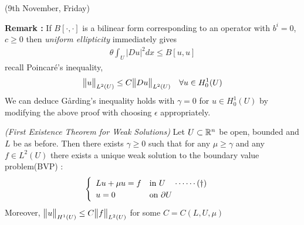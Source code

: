 \documentclass[12pt,a4paper]{report}
\begin{document}
\newday

(9th November, Friday)
\s

\textbf{Remark :} If $B[\cdot,\cdot]$ is a bilinear form corresponding to an operator with $b^i=0$, $c\geq 0$ then \emph{uniform ellipticity} immediately gives
\begin{align*}
\theta \int_U |Du|^2 dx \leq B[u,u]
\end{align*}
recall Poincar\'{e}'s inequality,
\begin{align*}
\bigl\lVert u\bigr\rVert_{L^2(U)} \leq C \bigl\lVert Du\bigr\rVert_{L^2(U)} \quad \forall u\in H_0^1 (U)
\end{align*}
We can deduce G{\aa}rding's inequality holds with $\gamma =0$ for $u\in H_0^1 (U)$ by modifying the above proof with choosing $\epsilon$ appropriately.
\s

\thm \emph{(First Existence Theorem for Weak Solutions)} Let $U\subset \mathbb{R}^n$ be open, bounded and $L$ be as before. Then there exists $\gamma \geq 0$ such that for any $\mu \geq \gamma$ and any $f\in L^2(U)$ there exists a unique weak solution to the boundary value problem(BVP) :
\begin{align*}
\begin{cases}
\begin{array}{ll}
Lu + \mu u =f & \text{in } U  \quad \cdots\cdots (\dagger) \\
u = 0 & \text{on } \partial U
\end{array}
\end{cases}
\end{align*}
Moreover, $\bigl\lVert u\bigr\rVert_{H^1(U)} \leq C \bigl\lVert f\bigr\rVert_{L^2(U)}$ for some $C = C(L,U,\mu)$
\s
\end{document}
